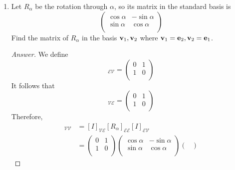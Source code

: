 \documentclass[../psets.tex]{subfiles}
\begin{document}
\begin{enumerate}[label={\textbf{6.\arabic*.}}]
    \item Let $R_\alpha$ be the rotation through $\alpha$, so its matrix in the standard basis is
    \begin{equation*}
        \begin{pmatrix}
            \cos\alpha & -\sin\alpha\\
            \sin\alpha & \cos\alpha\\
        \end{pmatrix}
    \end{equation*}
    Find the matrix of $R_\alpha$ in the basis $\mathbf{v}_1,\mathbf{v}_2$ where $\mathbf{v}_1=\mathbf{e}_2,\mathbf{v}_2=\mathbf{e}_1$.
    \begin{proof}[Answer]
        We define
        \begin{equation*}
            [I]_{\mathcal{E}\mathcal{V}} =
            \begin{pmatrix}
                0 & 1\\
                1 & 0\\
            \end{pmatrix}
        \end{equation*}
        It follows that
        \begin{equation*}
            [I]_{\mathcal{V}\mathcal{E}} =
            \begin{pmatrix}
                0 & 1\\
                1 & 0\\
            \end{pmatrix}
        \end{equation*}
        Therefore,
        \begin{align*}
            [R_\alpha]_{\mathcal{V}\mathcal{V}} &= [I]_{\mathcal{V}\mathcal{E}}[R_\alpha]_{\mathcal{E}\mathcal{E}}[I]_{\mathcal{E}\mathcal{V}}\\
            &=
            \begin{pmatrix}
                0 & 1\\
                1 & 0\\
            \end{pmatrix}
            \begin{pmatrix}
                \cos\alpha & -\sin\alpha\\
                \sin\alpha & \cos\alpha\\
            \end{pmatrix}
            \begin{pmatrix}

\end{pmatrix}
\end{align*}
\end{proof}
\end{enumerate}
\end{document}
